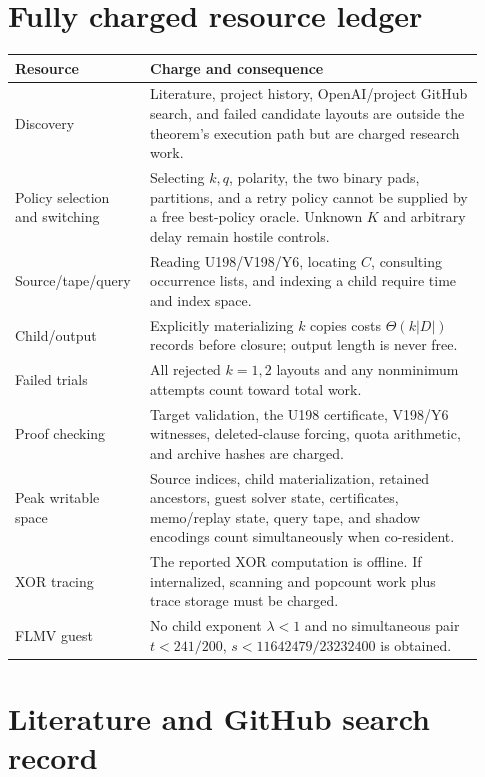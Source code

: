 \documentclass[11pt]{article}
\begin{document}
\section{Fully charged resource ledger}

\begin{longtable}{p{0.25\linewidth}p{0.68\linewidth}}
\toprule
Resource & Charge and consequence \\
\midrule
\endhead
Discovery & Literature, project history, OpenAI/project GitHub search, and failed candidate layouts are outside the theorem's execution path but are charged research work. \\
Policy selection and switching & Selecting $k,q$, polarity, the two binary pads, partitions, and a retry policy cannot be supplied by a free best-policy oracle.  Unknown $K$ and arbitrary delay remain hostile controls. \\
Source/tape/query & Reading U198/V198/Y6, locating $C$, consulting occurrence lists, and indexing a child require time and index space. \\
Child/output & Explicitly materializing $k$ copies costs $\Theta(k|D|)$ records before closure; output length is never free. \\
Failed trials & All rejected $k=1,2$ layouts and any nonminimum attempts count toward total work. \\
Proof checking & Target validation, the U198 certificate, V198/Y6 witnesses, deleted-clause forcing, quota arithmetic, and archive hashes are charged. \\
Peak writable space & Source indices, child materialization, retained ancestors, guest solver state, certificates, memo/replay state, query tape, and shadow encodings count simultaneously when co-resident. \\
XOR tracing & The reported XOR computation is offline.  If internalized, scanning and popcount work plus trace storage must be charged. \\
FLMV guest & No child exponent $\lambda<1$ and no simultaneous pair $t<241/200$, $s<11642479/23232400$ is obtained. \\
\bottomrule
\end{longtable}

\section{Literature and GitHub search record}
\end{document}
